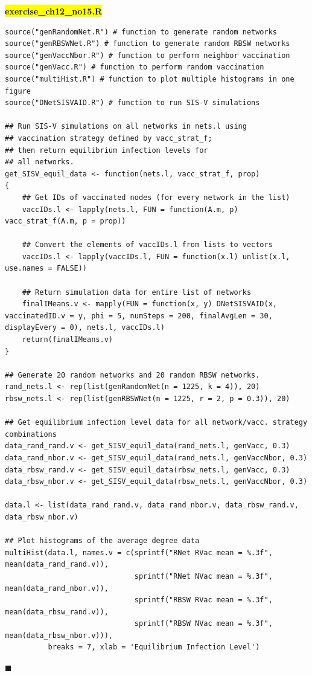 \documentclass[11pt]{article}
\newcommand{\mybox}{%
    \collectbox{%
        \setlength{\fboxsep}{2pt}%
        \fbox{\BOXCONTENT}%
    }%
}
\begin{document}
\noindent\mybox{\colorbox{yellow}{\textbf{exercise\_ch12\_no15.R}}}\hspace{3mm}\hrulefill
\begin{lstlisting}
source("genRandomNet.R") # function to generate random networks
source("genRBSWNet.R") # function to generate random RBSW networks
source("genVaccNbor.R") # function to perform neighbor vaccination
source("genVacc.R") # function to perform random vaccination
source("multiHist.R") # function to plot multiple histograms in one figure
source("DNetSISVAID.R") # function to run SIS-V simulations

## Run SIS-V simulations on all networks in nets.l using
## vaccination strategy defined by vacc_strat_f;
## then return equilibrium infection levels for
## all networks.
get_SISV_equil_data <- function(nets.l, vacc_strat_f, prop)
{
	## Get IDs of vaccinated nodes (for every network in the list)
	vaccIDs.l <- lapply(nets.l, FUN = function(A.m, p) vacc_strat_f(A.m, p = prop))
	
	## Convert the elements of vaccIDs.l from lists to vectors		
	vaccIDs.l <- lapply(vaccIDs.l, FUN = function(x.l) unlist(x.l, use.names = FALSE))
	
	## Return simulation data for entire list of networks		
	finalIMeans.v <- mapply(FUN = function(x, y) DNetSISVAID(x, vaccinatedID.v = y, phi = 5, numSteps = 200, finalAvgLen = 30, displayEvery = 0), nets.l, vaccIDs.l)
	return(finalIMeans.v) 
}

## Generate 20 random networks and 20 random RBSW networks.
rand_nets.l <- rep(list(genRandomNet(n = 1225, k = 4)), 20)
rbsw_nets.l <- rep(list(genRBSWNet(n = 1225, r = 2, p = 0.3)), 20)

## Get equilibrium infection level data for all network/vacc. strategy combinations
data_rand_rand.v <- get_SISV_equil_data(rand_nets.l, genVacc, 0.3) 
data_rand_nbor.v <- get_SISV_equil_data(rand_nets.l, genVaccNbor, 0.3)
data_rbsw_rand.v <- get_SISV_equil_data(rbsw_nets.l, genVacc, 0.3)
data_rbsw_nbor.v <- get_SISV_equil_data(rbsw_nets.l, genVaccNbor, 0.3)

data.l <- list(data_rand_rand.v, data_rand_nbor.v, data_rbsw_rand.v, data_rbsw_nbor.v)

## Plot histograms of the average degree data
multiHist(data.l, names.v = c(sprintf("RNet RVac mean = %.3f", mean(data_rand_rand.v)),
                              sprintf("RNet NVac mean = %.3f", mean(data_rand_nbor.v)),
                              sprintf("RBSW RVac mean = %.3f", mean(data_rbsw_rand.v)),
                              sprintf("RBSW NVac mean = %.3f", mean(data_rbsw_nbor.v))),
          breaks = 7, xlab = 'Equilibrium Infection Level')

\end{lstlisting}

\hfill$\blacksquare$


\vfill
\begin{center}
\end{center}
\begin{center}
\vspace{-0.6cm}
\hrulefill \\
\vspace{-0.7cm}
\hrulefill
\end{center}
\end{document}
